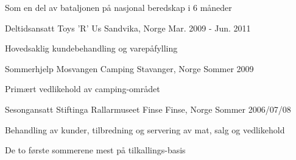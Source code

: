 \begin{cventries}
{\begin{cvitems}
        \item {Som en del av bataljonen på nasjonal beredskap i 6 måneder}
      \end{cvitems}
    }
    \cventry
    {Deltidsansatt}
    {Toys 'R' Us}
    {Sandvika, Norge}
    {Mar. 2009 - Jun. 2011}
    {
      \begin{cvitems}
        \item {Hovedsaklig kundebehandling og varepåfylling}
      \end{cvitems}
    }
    \cventry
    {Sommerhjelp}
    {Mosvangen Camping}
    {Stavanger, Norge}
    {Sommer 2009}
    {
      \begin{cvitems}
        \item {Primært vedlikehold av camping-området}
      \end{cvitems}
    }
    \cventry
    {Sesongansatt}
    {Stiftinga Rallarmuseet Finse}
    {Finse, Norge}
    {Sommer 2006/07/08}
    {
      \begin{cvitems}
        \item {Behandling av kunder, tilbredning og servering av mat, salg og vedlikehold}
        \item {De to første sommerene mest på tilkallings-basis}
      \end{cvitems}
    }
\end{cventries}
